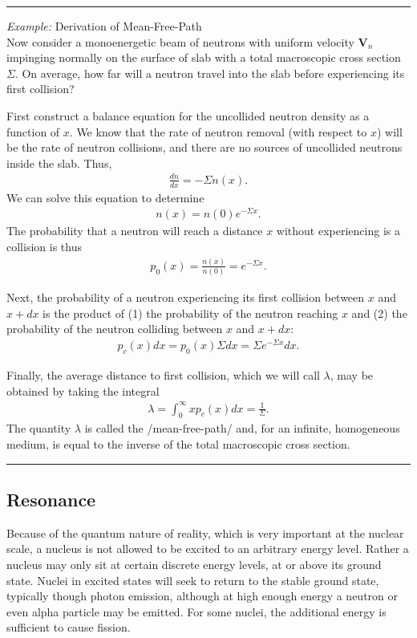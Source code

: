 \documentclass[11pt]{article}
\renewcommand\vec{\mathbf}
\newenvironment{example}[1]{\vspace{0.2in}\hrule\vspace{0.1in}\noindent\emph{Example:} #1 \\}{\vspace{0.1in}\hrule\vspace{0.2in}}
\begin{document}
\begin{example}{Derivation of Mean-Free-Path}
Now consider a monoenergetic beam of neutrons with uniform velocity $\vec{V}_n$ impinging normally on the surface of slab with a total macroscopic cross section $\Sigma$.  On average, how far will a neutron travel into the slab before experiencing its first collision?

First construct a balance equation for the uncollided neutron density as a function of $x$.  We know that the rate of neutron removal (with respect to $x$) will be the rate of neutron collisions, and there are no sources of uncollided neutrons inside the slab.  Thus,
\begin{align}
  \frac{dn}{dx} = -\Sigma n(x).
\end{align}
We can solve this equation to determine
\begin{align}
  n(x) = n(0) e^{-\Sigma x}.
\end{align}
The probability that a neutron will reach a distance $x$ without experiencing is a collision is thus
\begin{align}
  p_0(x) = \frac{n(x)}{n(0)} = e^{-\Sigma x}.
\end{align}

Next, the probability of a neutron experiencing its first collision between $x$ and $x+dx$ is the product of (1) the probability of the neutron reaching $x$ and (2) the probability of the neutron colliding between $x$ and $x+dx$:
\begin{align}
  p_c(x)dx = p_0(x) \Sigma dx = \Sigma e^{-\Sigma x} dx.
\end{align}

Finally, the average distance to first collision, which we will call $\lambda$, may be obtained by taking the integral
\begin{align}
  \lambda = \int_0^\infty x p_c(x) dx = \frac{1}{\Sigma}.
\end{align}
The quantity $\lambda$ is called the /mean-free-path/ and, for an infinite, homogeneous medium, is equal to the inverse of the total macroscopic cross section.
\end{example}

\subsection{Resonance}
\label{sec:orgheadline17}
Because of the quantum nature of reality, which is very important at the nuclear scale, a nucleus is not allowed to be excited to an arbitrary energy level.  Rather a nucleus may only sit at certain discrete energy levels, at or above its ground state.  Nuclei in excited states will seek to return to the stable ground state, typically though photon emission, although at high enough energy a neutron or even alpha particle may be emitted.  For some nuclei, the additional energy is sufficient to cause fission.  
\end{document}
